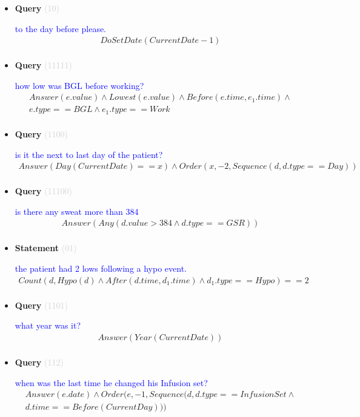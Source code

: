 \documentclass[11pt]{article}
\newcommand{\key}[1]{\textcolor{lightgray}{#1}}
\newcounter{CQuery}
\newcounter{CStatement}
\begin{document}
\begin{itemize}
\item
\textbf{Query\theCQuery} \key{(10)} \addtocounter{CQuery}{1}
\textcolor{blue}{ to the day before please. }
\begin{multline*}
DoSetDate(CurrentDate - 1) \\ 
\end{multline*}


\item
\textbf{Query\theCQuery} \key{(11111)} \addtocounter{CQuery}{1}
\textcolor{blue}{ how low was BGL before working? }
\begin{multline*}
Answer(e.value) \wedge Lowest(e.value) \wedge Before(e.time, e_1.time) \wedge \\ 
e.type==BGL \wedge e_1.type==Work \\ 
\end{multline*}


\item
\textbf{Query\theCQuery} \key{(1100)} \addtocounter{CQuery}{1}
\textcolor{blue}{ is it the next to last day of the patient? }
\begin{multline*}
Answer(Day(CurrentDate)==x) \wedge Order(x, -2, Sequence(d, d.type==Day)) \\ 
\end{multline*}


\item
\textbf{Query\theCQuery} \key{(11100)} \addtocounter{CQuery}{1}
\textcolor{blue}{ is there any sweat more than 384 }
\begin{multline*}
Answer(Any(d.value>384 \wedge d.type==GSR)) \\ 
\end{multline*}


\item
\textbf{Statement\theCStatement} \key{(01)} \addtocounter{CStatement}{1}
\textcolor{blue}{ the patient had 2 lows following a hypo event. }
\begin{multline*}
Count(d, Hypo(d) \wedge After(d.time, d_1.time) \wedge d_1.type==Hypo)==2 \\ 
\end{multline*}


\item
\textbf{Query\theCQuery} \key{(1101)} \addtocounter{CQuery}{1}
\textcolor{blue}{ what year was it? }
\begin{multline*}
Answer(Year(CurrentDate)) \\ 
\end{multline*}


\item
\textbf{Query\theCQuery} \key{(112)} \addtocounter{CQuery}{1}
\textcolor{blue}{ when was the last time he changed his Infusion set? }
\begin{multline*}
Answer(e.date) \wedge Order(e, -1, Sequence(d, d.type==InfusionSet\wedge \\ 
d.time==Before(CurrentDay))) \\ 
\end{multline*}



\end{itemize}
\end{document}
